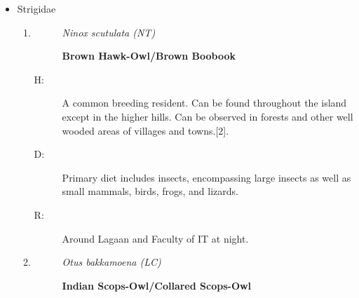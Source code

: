 \begin{itemize}
\begin{enumerate}%
\item%
\begin{description}%
\item[]%
\textit{Himantopus himantopus (LC)}%
\item[]%
\textbf{Black{-}winged Stilt}%
\end{description}%
\begin{description}%
\item[H: ]%
Fairly common breeding resident in dry lowlands. A few birds breed in wet lowlands while others are winter migrants in the lowlands. Freshwater and brackish shallow waters in marshes, lagoons and tanks are the preferred habitats{[}2{]}.%
\item[D: ]%
Uses the sharp bills to peck and ingest only very small food such as molluscs, crustaceans, algae, flies and aquatic insects.%
\item[R: ]%
Observed at Boat yard as flocks in flight.%
\end{description}%
\end{enumerate}%
\item%
Strigidae%
\begin{enumerate}%
\item%
\begin{description}%
\item[]%
\textit{Ninox scutulata (NT)}%
\item[]%
\textbf{Brown Hawk{-}Owl/Brown Boobook}%
\end{description}%
\begin{description}%
\item[H: ]%
A common breeding resident. Can be found throughout the island except in the higher hills. Can be observed in forests and other well wooded areas of villages and towns.{[}2{]}.%
\item[D: ]%
Primary diet includes insects, encompassing large insects as well as small mammals, birds, frogs, and lizards.%
\item[R: ]%
Around Lagaan and Faculty of IT at night.%
\end{description}%
\item%
\begin{description}%
\item[]%
\textit{Otus bakkamoena (LC)}%
\item[]%
\textbf{Indian Scops{-}Owl/Collared Scops{-}Owl}%
\end{description}%
\begin{description}%

\end{description}
\end{enumerate}
\end{itemize}
